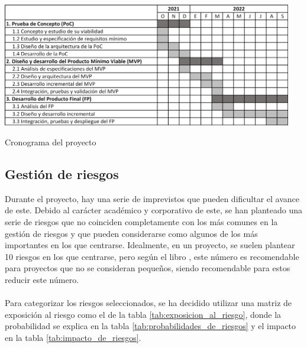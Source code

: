 \documentclass{subfiles}
\begin{document}
\begin{table}[ht]
\centering
\includegraphics[width=0.95\textwidth]{img/planificacion_cronograma.png}
\caption[Representación gráfica del patrón Modelo-Vista-Presentador.]{Cronograma del proyecto}
\label{tab:cronograma_del_proyecto}
\end{table}

        \subsection{Gestión de riesgos}
        \label{sec:gestion_de_riesgos}
        Durante el proyecto, hay una serie de imprevistos que pueden dificultar el avance de este. Debido al carácter académico y corporativo de este, se han planteado una serie de riesgos que no coinciden completamente con los más comunes en la gestión de riesgos y que pueden considerarse como algunos de los más importantes en los que centrarse. Idealmente, en un proyecto, se suelen plantear 10 riesgos en los que centrarse, pero según el libro  \cite{book:hughes_bob_softwareprojectManagement}, este número es recomendable para proyectos que no se consideran pequeños, siendo recomendable para estos reducir este número.

        \paragraph{}
        Para categorizar los riesgos seleccionados, se ha decidido utilizar una matriz de exposición al riesgo como el de la tabla \ref{tab:exposicion_al_riesgo}, donde la probabilidad se explica en la tabla \ref{tab:probabilidades_de_riesgos} y el impacto en la tabla \ref{tab:impacto_de_riesgos}.
\end{document}
